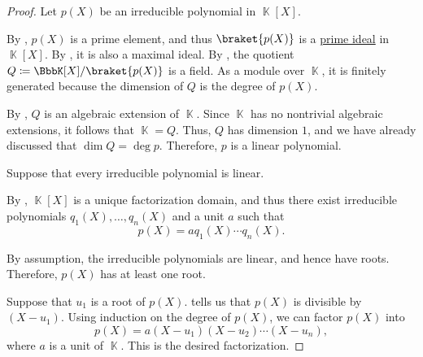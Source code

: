 \begin{proof}
   Let \( p(X) \) be an irreducible polynomial in \( \BbbK[X] \).

  By , \( p(X) \) is a prime element, and thus \( \braket {p(X)} \) is a \hyperref[def:semiring_ideal/prime]{prime ideal} in \( \BbbK[X] \). By , it is also a maximal ideal. By , the quotient \( Q \coloneqq \BbbK[X] / \braket{ p(X) } \) is a field. As a module over \( \BbbK \), it is finitely generated because the dimension of \( Q \) is the degree of \( p(X) \).

  By , \( Q \) is an algebraic extension of \( \BbbK \). Since \( \BbbK \) has no nontrivial algebraic extensions, it follows that \( \BbbK = Q \). Thus, \( Q \) has dimension \( 1 \), and we have already discussed that \( \dim Q = \deg p \). Therefore, \( p \) is a linear polynomial.

   Suppose that every irreducible polynomial is linear.

  By , \( \BbbK[X] \) is a unique factorization domain, and thus there exist irreducible polynomials \( q_1(X), \ldots, q_n(X) \) and a unit \( a \) such that
  \begin{equation*}
    p(X) = a q_1(X) \cdots q_n(X).
  \end{equation*}

  By assumption, the irreducible polynomials are linear, and hence have roots. Therefore, \( p(X) \) has at least one root.

   Suppose that \( u_1 \) is a root of \( p(X) \).  tells us that \( p(X) \) is divisible by \( (X - u_1) \). Using induction on the degree of \( p(X) \), we can factor \( p(X) \) into
  \begin{equation*}
    p(X) = a (X - u_1) (X - u_2) \cdots (X - u_n),
  \end{equation*}
  where \( a \) is a unit of \( \BbbK \). This is the desired factorization.


\end{proof}
